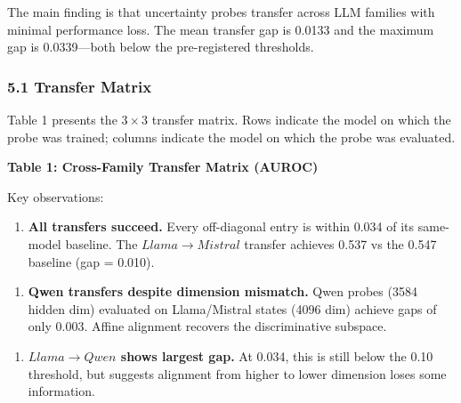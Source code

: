 
The main finding is that uncertainty probes transfer across LLM families with minimal performance loss. The mean transfer gap is 0.0133 and the maximum gap is 0.0339---both below the pre-registered thresholds.

\subsubsection{5.1 Transfer Matrix}

Table 1 presents the $3\times 3$ transfer matrix. Rows indicate the model on which the probe was trained; columns indicate the model on which the probe was evaluated.

\textbf{Table 1: Cross-Family Transfer Matrix (AUROC)}

\begin{table}[htbp]
\centering
{}
\end{table}

Key observations:

\begin{enumerate}
\item \textbf{All transfers succeed.} Every off-diagonal entry is within 0.034 of its same-model baseline. The $Llama\rightarrow Mistral$ transfer achieves 0.537 vs the 0.547 baseline (gap = 0.010).
\end{enumerate}

\begin{enumerate}
\item \textbf{Qwen transfers despite dimension mismatch.} Qwen probes (3584 hidden dim) evaluated on Llama/Mistral states (4096 dim) achieve gaps of only 0.003. Affine alignment recovers the discriminative subspace.
\end{enumerate}

\begin{enumerate}
\item \textbf{$Llama\rightarrow Qwen$ shows largest gap.} At 0.034, this is still below the 0.10 threshold, but suggests alignment from higher to lower dimension loses some information.
\end{enumerate}

